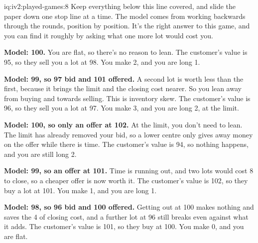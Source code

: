 \begin{solution}{iq:iv2:played-games:8}
Keep everything below this line covered, and slide the paper down one stop line at a time. The model comes from working backwards through the rounds, position by position. It's the right answer to this game, and you can find it roughly by asking what one more lot would cost you.

\ivstop
\textbf{Model: 100.} You are flat, so there's no reason to lean. The customer's value is 95, so they sell you a lot at 98. You make 2, and you are long 1.

\ivstop
\textbf{Model: 99, so 97 bid and 101 offered.} A second lot is worth less than the first, because it brings the limit and the closing cost nearer. So you lean away from buying and towards selling. This is inventory skew. The customer's value is 96, so they sell you a lot at 97. You make 3, and you are long 2, at the limit.

\ivstop
\textbf{Model: 100, so only an offer at 102.} At the limit, you don't need to lean. The limit has already removed your bid, so a lower centre only gives away money on the offer while there is time. The customer's value is 94, so nothing happens, and you are still long 2.

\ivstop
\textbf{Model: 99, so an offer at 101.} Time is running out, and two lots would cost 8 to close, so a cheaper offer is now worth it. The customer's value is 102, so they buy a lot at 101. You make 1, and you are long 1.

\ivstop
\textbf{Model: 98, so 96 bid and 100 offered.} Getting out at 100 makes nothing and saves the 4 of closing cost, and a further lot at 96 still breaks even against what it adds. The customer's value is 101, so they buy at 100. You make 0, and you are flat.


\end{solution}
